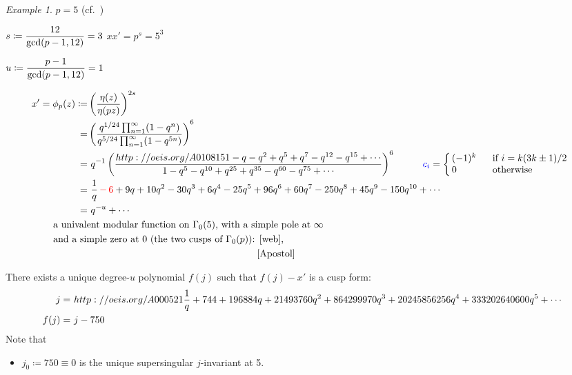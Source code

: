 \documentclass{rs}
\theoremstyle{definition}
\theoremstyle{remark}
\newtheorem{ex}[equation]{Example}
\renewcommand{\gcd}{{\rm gcd}}
\newcommand{\G}{\Gamma}
\newcommand{\ce}{\coloneqq}
\renewcommand{\=}{\approx}
\renewcommand{\-}{\sim}
\newcommand{\rd}[1]{{\textcolor{red}{#1}}}
\newcommand{\bl}[1]{{\textcolor{blue}{#1}}}
\numberwithin{equation}{section}
\begin{document}
\begin{ex}
 $p = 5$ (cf.~\cite[p788]{Ahlgren}) 

 $s \ce \dfrac{12}{\gcd(p - 1, 12)} = 3$ \qquad $x x' = p^s = 5^3$ 

 $u \ce \dfrac{p - 1}{\gcd(p - 1, 12)} = 1$ 

 \[
  \begin{split}
   x' = \phi_p(z) \ce & \left( \frac{\eta(z)}{\eta(p z)} \right)^{2 s} \\
                    = & \left( \frac{q^{1/24} \prod_{n = 1}^\infty (1 - q^n)}{q^{5/24} \prod_{n = 1}^\infty (1 - q^{5 n})} \right)^6 \\
                    = & ~ q^{-1} \left( \frac{\href{http://oeis.org/A010815}{1 - q - q^2 + q^5 + q^7 - q^{12} - q^{15} + \cdots}}{1 - q^5 - q^{10} + q^{25} + q^{35} - q^{60} - q^{75} + \cdots} \right)^6 
                        \hskip 1cm \bl{c_i} = \left\{
                        \begin{array}{ll}
                         \!\! (-1)^k & ~~ \text{if $i = k (3 k \pm 1) / 2$} \\
                         \!\! 0 & ~~ \text{otherwise} 
                        \end{array}
                        \right. \\
                    = & ~ \frac{1}{q} \, \rd{- \, 6} + 9 q + 10 q^2 - 30 q^3 + 6 q^4 -25 q^5 + 96 q^6 + 60 q^7 - 250 q^8 + 45 q^9 - 150 q^{10} + \cdots \\
                    = & ~ q^{-u} + \cdots \\
                      & \hskip -1.25cm \text{a univalent modular function on $\G_0(5)$, with a simple pole at $\infty$} \\
                      & \hskip -1.25cm \text{and a simple zero at 0 (the two cusps of $\G_0(p)$): \cite[Section 1.4, esp.~Theorem 1.64]{web},} \\
                      & \hskip 6.17cm \text{\cite[Sections 4.7-4.10, esp.~Theorems 4.7 and 4.9]{Apostol}} 
  \end{split}
 \]

 There exists a unique degree-$u$ polynomial $f(j)$ such that $f(j) - x'$ is a cusp form: 
 \[
  \begin{split}
      j = & ~ \relax{http://oeis.org/A000521}{\dfrac{1}{q} + 744 + 196884 q + 21493760 q^2 + 864299970 q^3 + 20245856256 q^4 + 333202640600 q^5 + \cdots} \\
   f(j) = & ~ j - 750 
  \end{split}
 \]
 Note that 
 \begin{itemize}
  \item $j_0 \ce 750 \equiv 0$ is the unique supersingular $j$-invariant at 5.  


\end{itemize}
\end{ex}
\end{document}
